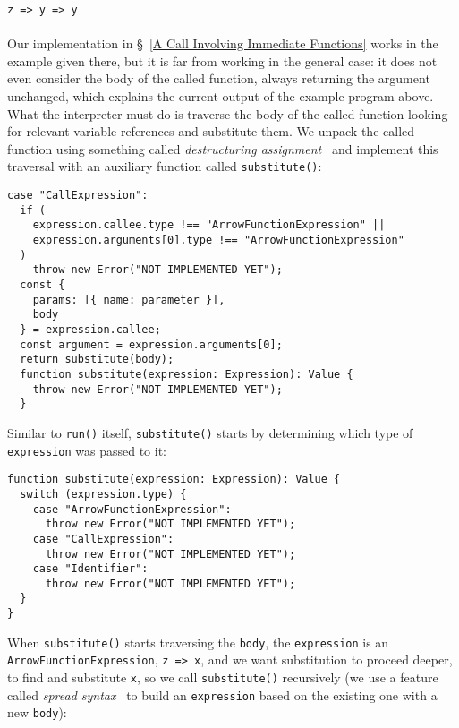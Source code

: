 \documentclass[12pt, oneside]{book}
\begin{document}
\begin{verbatim}
z => y => y
\end{verbatim}

\paragraph{}

Our implementation in §~\ref{A Call Involving Immediate Functions} works in the example given there, but it is far from working in the general case: it does not even consider the body of the called function, always returning the argument unchanged, which explains the current output of the example program above. What the interpreter must do is traverse the body of the called function looking for relevant variable references and substitute them. We unpack the called function using something called \emph{destructuring assignment}~\cite{destructuring-assignment} and implement this traversal with an auxiliary function called \texttt{substitute()}:

\begin{verbatim}
case "CallExpression":
  if (
    expression.callee.type !== "ArrowFunctionExpression" ||
    expression.arguments[0].type !== "ArrowFunctionExpression"
  )
    throw new Error("NOT IMPLEMENTED YET");
  const {
    params: [{ name: parameter }],
    body
  } = expression.callee;
  const argument = expression.arguments[0];
  return substitute(body);
  function substitute(expression: Expression): Value {
    throw new Error("NOT IMPLEMENTED YET");
  }
\end{verbatim}

Similar to \texttt{run()} itself, \texttt{substitute()} starts by determining which type of \texttt{expression} was passed to it:

\begin{verbatim}
function substitute(expression: Expression): Value {
  switch (expression.type) {
    case "ArrowFunctionExpression":
      throw new Error("NOT IMPLEMENTED YET");
    case "CallExpression":
      throw new Error("NOT IMPLEMENTED YET");
    case "Identifier":
      throw new Error("NOT IMPLEMENTED YET");
  }
}
\end{verbatim}

When \texttt{substitute()} starts traversing the \texttt{body}, the \texttt{expression} is an \texttt{ArrowFunctionExpression}, \texttt{z => x}, and we want substitution to proceed deeper, to find and substitute \texttt{x}, so we call \texttt{substitute()} recursively (we use a feature called \emph{spread syntax}~\cite{spread-syntax} to build an \texttt{expression} based on the existing one with a new \texttt{body}):
\end{document}

